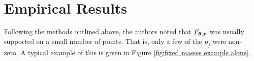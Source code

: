 

\section{Empirical Results}
\label{sec:deconvolution empirical results}
	Following the methods outlined above, the authors noted that $F_{{\bm{{\theta}}}, {\bm{{p}}}}$ was usually supported on a small number of points. That is, only a few of the $p_j$ were non-zero. A typical example of this is given in Figure \ref{fig:fixed masses example alone}.

